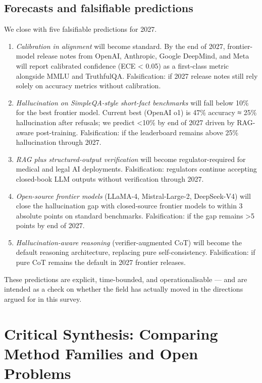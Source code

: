 \subsection{Forecasts and falsifiable predictions}\label{forecasts-and-falsifiable-predictions}

We close with five falsifiable predictions for 2027.

\begin{enumerate}
\def\labelenumi{(\arabic{enumi})}
\item
  \emph{Calibration in alignment} will become standard. By the end of 2027, frontier-model release notes from OpenAI, Anthropic, Google DeepMind, and Meta will report calibrated confidence (ECE \textless{} 0.05) as a first-class metric alongside MMLU and TruthfulQA. Falsification: if 2027 release notes still rely solely on accuracy metrics without calibration.
\item
  \emph{Hallucination on SimpleQA-style short-fact benchmarks} will fall below 10\% for the best frontier model. Current best (OpenAI o1) is 47\% accuracy ≈ 25\% hallucination after refusals; we predict \textless10\% by end of 2027 driven by RAG-aware post-training. Falsification: if the leaderboard remains above 25\% hallucination through 2027.
\item
  \emph{RAG plus structured-output verification} will become regulator-required for medical and legal AI deployments. Falsification: regulators continue accepting closed-book LLM outputs without verification through 2027.
\item
  \emph{Open-source frontier models} (LLaMA-4, Mistral-Large-2, DeepSeek-V4) will close the hallucination gap with closed-source frontier models to within 3 absolute points on standard benchmarks. Falsification: if the gap remains \textgreater5 points by end of 2027.
\item
  \emph{Hallucination-aware reasoning} (verifier-augmented CoT) will become the default reasoning architecture, replacing pure self-consistency. Falsification: if pure CoT remains the default in 2027 frontier releases.
\end{enumerate}

These predictions are explicit, time-bounded, and operationalisable --- and are intended as a check on whether the field has actually moved in the directions argued for in this survey.

\section{Critical Synthesis: Comparing Method Families and Open Problems}\label{critical-synthesis-comparing-method-families-and-open-problems}

